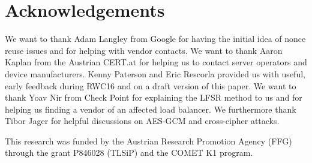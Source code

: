 \documentclass[10pt, a4paper]{article}
\begin{document}
\section{Acknowledgements}

We want to thank Adam Langley from Google for having the initial idea of nonce reuse issues and for helping
with vendor contacts.
We want to thank Aaron Kaplan from the Austrian CERT.at for helping us to contact server operators and device manufacturers. Kenny Paterson and Eric Rescorla
provided us with useful, early feedback during RWC16 and on a draft version of this paper. We want to thank Yoav Nir
from Check Point for explaining the LFSR method to us and for helping us finding a vendor of an affected load balancer. We furthermore thank Tibor Jager
for helpful discussions on AES-GCM and cross-cipher attacks.


This research was funded by the Austrian Research Promotion Agency (FFG) through the grant P846028 (TLSiP) and the COMET K1 program.
{
}
\end{document}
